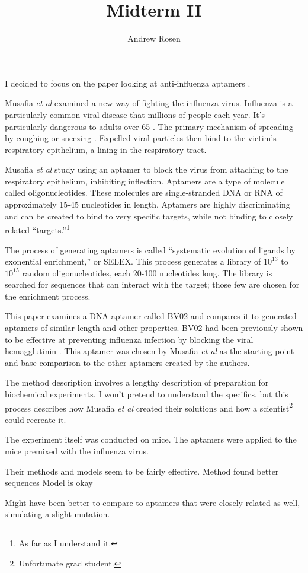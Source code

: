 \documentclass[10pt,a4paper]{article}
\author{Andrew Rosen}
\title{Midterm II}
\begin{document}
	\maketitle
	
	I decided to focus on the paper looking at anti-influenza aptamers  \cite{musafia2014designing}.
	
	
	
	Musafia \textit{et al} examined a new way of fighting the influenza virus.
	Influenza is a particularly common viral disease that millions of people each year.
	It's particularly dangerous to adults over 65 \cite{centers2010estimates}.
	The primary mechanism of spreading  by coughing or sneezing \cite{stephenson2002epidemiology}.
	Expelled viral particles then bind to the victim's respiratory epithelium, a lining in the respiratory tract.
	
	Musafia \textit{et al} study using an aptamer to block the virus from attaching to the respiratory epithelium, inhibiting inflection.
	Aptamers are a type of molecule called oligonucleotides.
	These molecules are single-stranded DNA or RNA of approximately 15-45 nucleotides in length. 
	Aptamers  are highly discriminating and can be created to bind to very specific targets, while not binding to closely related ``targets.''\footnote{As far as I understand it.}
	
	The process of generating aptamers is called ``systematic evolution of ligands by exonential enrichment,'' or SELEX.
	This process generates a library of $ 10^{13} $ to $ 10 ^{15} $ random oligonucleotides, each 20-100 nucleotides long.
	The library is searched for sequences that can interact with the target; those few are chosen for the enrichment process.
	
	This paper examines a DNA aptamer called BV02 and compares it to generated aptamers of similar length and other properties.
	BV02 had been previously shown to be effective at preventing influenza infection by blocking the viral hemagglutinin \cite{jeon2004dna}.
	This aptamer was chosen by Musafia \textit{et al} as the starting point and base comparison to the other aptamers created by the authors.
		
	The method description involves a lengthy description of preparation  for biochemical experiments.  
	I won't pretend to understand the specifics, but this process describes how Musafia \textit{et al}  created their solutions and how a scientist\footnote{Unfortunate grad student.} could recreate it.
	
	
	The experiment itself was conducted on mice.
	The aptamers were applied to the mice premixed with the influenza virus.
	
	
	Their methods and models seem to be fairly effective.
	Method found better sequences
	Model is okay
	
	Might have been better to compare to aptamers that were closely related as well, simulating a slight mutation.
	
	
	
	
	
\end{document}
